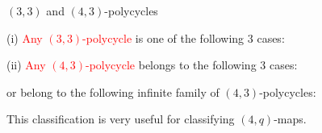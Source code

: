 \documentclass[%
pdf,
colorBG,
slideColor,
]{prosper}
\begin{document}
\begin{slide}{$(3,3)$ and $(4,3)$-polycycles}
{\it\scriptsize


(i) \textcolor{red}{Any $(3,3)$-polycycle} is one of the following $3$ cases:
\begin{center}
\end{center}

(ii) \textcolor{red}{Any $(4,3)$-polycycle} belongs to the following $3$ cases:
\begin{center}
\end{center}
\hspace{1cm}or belong to the following infinite family of $(4,3)$-polycycles:
\begin{center}
\end{center}

}
This classification is very useful for classifying $(4,q)$-maps.

\end{slide}
\end{document}

